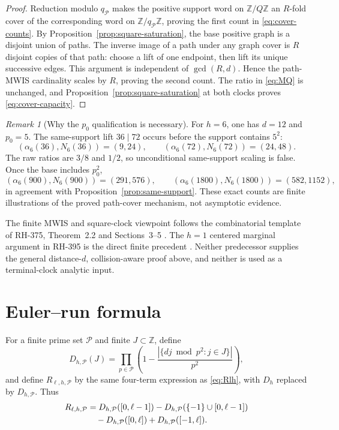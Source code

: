 \documentclass[11pt]{article}
\theoremstyle{definition}
\theoremstyle{remark}
\newtheorem{remark}[theorem]{Remark}
\newcommand{\Z}{\mathbb Z}
\begin{document}
\begin{proof}
Reduction modulo \(q_{\mathcal P}\) makes the positive support word on
\(\Z/Q\Z\) an \(R\)-fold cover of the corresponding word on
\(\Z/q_{\mathcal P}\Z\), proving the first count in
\eqref{eq:cover-counts}.  By Proposition~\ref{prop:square-saturation},
the base positive graph is a disjoint union of paths.  The inverse image
of a path under any graph cover is \(R\) disjoint copies of that path:
choose a lift of one endpoint, then lift its unique successive edges.
This argument is independent of \(\gcd(R,d)\).  Hence the path-MWIS
cardinality scales by \(R\), proving the second count.  The ratio in
\eqref{eq:MQ} is unchanged, and
Proposition~\ref{prop:square-saturation} at both clocks proves
\eqref{eq:cover-capacity}.
\end{proof}

\begin{remark}[Why the \(p_0\) qualification is necessary]
\label{rem:p0-counterexample}
For \(h=6\), one has \(d=12\) and \(p_0=5\).  The same-support lift
\(36\mid72\) occurs before the support contains \(5^2\):
\[
 (\alpha_6(36),N_6(36))=(9,24),\qquad
 (\alpha_6(72),N_6(72))=(24,48).
\]
The raw ratios are \(3/8\) and \(1/2\), so unconditional
same-support scaling is false.  Once the base includes \(p_0^2\),
\[
 (\alpha_6(900),N_6(900))=(291,576),\qquad
 (\alpha_6(1800),N_6(1800))=(582,1152),
\]
in agreement with Proposition~\ref{prop:same-support}.  These exact
counts are finite illustrations of the proved path-cover mechanism, not
asymptotic evidence.
\end{remark}

The finite MWIS and square-clock viewpoint follows the combinatorial
template of RH-375, Theorem~2.2 and Sections~3--5
\cite{RH375}.  The \(h=1\) centered marginal argument in RH-395 is the
direct finite precedent \cite{RH395}.  Neither predecessor supplies the
general distance-\(d\), collision-aware proof above, and neither is used
as a terminal-clock analytic input.

\section{Euler--run formula}

For a finite prime set \(\mathcal P\) and finite \(J\subset\Z\), define
\begin{equation}
 D_{h,\mathcal P}(J)=
 \prod_{p\in\mathcal P}\left(
 1-\frac{|\{dj\bmod p^2:j\in J\}|}{p^2}\right),
 \label{eq:finite-D}
\end{equation}
and define \(R_{\ell,h,\mathcal P}\) by the same four-term expression as
\eqref{eq:Rlh}, with \(D_h\) replaced by
\(D_{h,\mathcal P}\).  Thus
\begin{align}
 R_{\ell,h,\mathcal P}
 &=D_{h,\mathcal P}([0,\ell-1])
 -D_{h,\mathcal P}(\{-1\}\cup[0,\ell-1])\notag\\
 &\quad-D_{h,\mathcal P}([0,\ell])
 +D_{h,\mathcal P}([-1,\ell]).
 \label{eq:finite-R}
\end{align}
\end{document}
